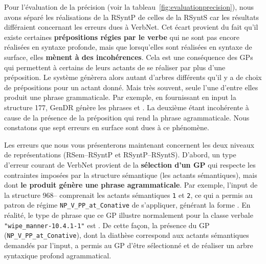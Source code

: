 Pour l'évaluation de la précision (voir la tableau~\ref{fig:evaluationprecision}), nous avons séparé les réalisations de la \ac{RSyntP} de celles de la \ac{RSyntS} car les résultats différaient concernant les erreurs dues à VerbNet. Cet écart provient du fait qu'il existe certaines \textbf{prépositions régies par le verbe} qui ne sont pas encore réalisées en syntaxe profonde, mais que lorsqu'elles sont réalisées en syntaxe de surface, elles \textbf{mènent à des incohérences}. Cela est une conséquence des \acp{GP} qui permettent à certains de leurs actants de se réaliser par plus d'une préposition. Le système génèrera alors autant d'arbres différents qu'il y a de choix de prépositions pour un actant donné. Mais très souvent, seule l'une d'entre elles produit une phrase grammaticale. Par exemple, en fournissant en input la structure 177, GenDR génère les phrases  et \ungr{}. La deuxième étant incohérente à cause de la présence de la préposition  qui rend la phrase agrammaticale. Nous constatons que sept erreurs en surface sont dues à ce phénomène.

Les erreurs que nous vous présenterons maintenant concernent les deux niveaux de représentations (\ac{RSem}--\ac{RSyntP} et \ac{RSyntP}--\ac{RSyntS}). D'abord, un type d'erreur courant de VerbNet provient de la \textbf{sélection d'un \ac{GP}} qui respecte les contraintes imposées par la structure sémantique (les actants sémantiques), mais dont \textbf{le produit génère une phrase agrammaticale}. Par exemple, l'input de la structure 968-- comprenait les actants sémantiques \texttt{1} et \texttt{2}, ce qui a permis au patron de régime \texttt{NP\_V\_PP\_at\_Conative} de s'appliquer, générant la forme \ungr{}. En réalité, le type de phrase que ce \ac{GP} illustre normalement pour la classe verbale \texttt{"wipe\_manner-10.4.1-1"} est . De cette façon, la présence du \ac{GP} (\texttt{NP\_V\_PP\_at\_Conative}), dont la diathèse correspond aux actants sémantiques demandés par l'input, a permis au \ac{GP} d'être sélectionné et de réaliser un arbre syntaxique profond agrammatical.

